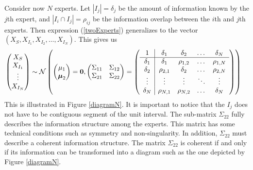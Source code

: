 \documentclass[11pt,twoside]{article}
\begin{document}
Consider now $N$ experts. Let $|I_j| = \delta_j$ be the amount of information known by the $j$th expert, and $|I_i \cap I_j| = \rho_{ij}$ be the information overlap between the $i$th and $j$th experts. Then expression (\ref{twoExperts}) generalizes to the vector $(X_{S}, X_{I_1}, X_{I_2}, \dots, X_{I_N})$. This gives us
\begin{align*}
\left(\begin{matrix} X_S \\ X_{I_1}\\ \vdots \\ X_{I_N} \end{matrix}\right) &\sim \mathcal{N}\left( \left(\begin{matrix} 
\mu_1 \\ \boldsymbol{\mu}_2
 \end{matrix}\right) =
 \boldsymbol{0}, \left(\begin{matrix} 
\Sigma_{11} & \Sigma_{12}\\
\Sigma_{21} & \Sigma_{22}\\
 \end{matrix}\right) 
 =
 \left(\begin{array}{c | c c cc }
1 & \delta_1 & \delta_2 & \dots & \delta_N  \\ \hline
\delta_1 & \delta_1 &\rho_{1,2} & \dots & \rho_{1,N}   \\ 
\delta_2 & \rho_{2,1} & \delta_2 & \dots & \rho_{2,N}  \\ 
\vdots & \vdots & \vdots & \ddots & \vdots  \\ 
\delta_N & \rho_{N,1} & \rho_{N,2} & \dots & \delta_N\\ 
 \end{array}\right)\right)
\end{align*}
This is illustrated in Figure \ref{diagramN}. It is important to notice that the $I_j$ does not have to be contiguous segment of the unit interval. The sub-matrix $\Sigma_{22}$ fully describes the information structure among the experts.  This matrix has some technical conditions such as symmetry and non-singularity. In addition, $\Sigma_{22}$ must describe a coherent information structure. The matrix $\Sigma_{22}$ is coherent if and only if its information can be transformed into a diagram such as the one depicted by Figure \ref{diagramN}.
\end{document}
